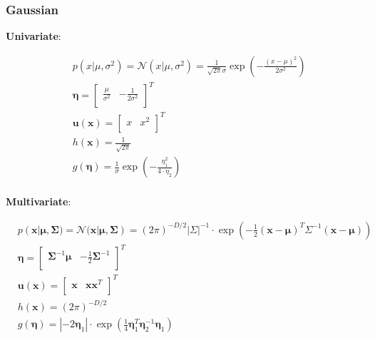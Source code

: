 \subsubsection{Gaussian}
\textbf{Univariate}:
\begin{fleqn}[\parindent]
	\begin{equation*}
	\begin{split}
	& p(x|\mu, \sigma^2) = \mathcal{N}(x|\mu, \sigma^2) = \frac{1}{\sqrt{2\pi}\sigma}\exp\left(-\frac{(x-\mu)^2}{2\sigma^2}\right)\\[8pt]
	& \bm{\eta} = \begin{bmatrix}
	\frac{\mu}{\sigma^2} & -\frac{1}{2\sigma^2}\\
	\end{bmatrix}^T\\
	& \bm{u}(\bm{x}) = \begin{bmatrix}
	x & x^2\\
	\end{bmatrix}^T\\
	& h(\bm{x}) = \frac{1}{\sqrt{2\pi}}\\
	& g(\bm{\eta}) = \frac{1}{\sigma}\exp\left(-\frac{\eta_1^2}{4\cdot \eta_2}\right)\\
	\end{split}
	\end{equation*}
\end{fleqn}
\textbf{Multivariate}:
\begin{fleqn}[\parindent]
	\begin{equation*}
		\begin{split}
			& p(\bm{x}|\bm{\mu}, \bm{\Sigma}) = \mathcal{N}(\bm{x}|\bm{\mu}, \bm{\Sigma}) = (2\pi)^{-D/2}|\Sigma|^{-1}\cdot \exp\left(-\frac{1}{2}(\bm{x}-\bm{\mu})^T\Sigma^{-1}(\bm{x}-\bm{\mu})\right)\\[8pt]
			& \bm{\eta} = \begin{bmatrix}
			\bm{\Sigma}^{-1}\bm{\mu} & -\frac{1}{2}\bm{\Sigma}^{-1}\\
			\end{bmatrix}^T\\
			& \bm{u}(\bm{x}) = \begin{bmatrix}
				\bm{x} & \bm{x}\bm{x}^T\\
			\end{bmatrix}^T\\
			& h(\bm{x}) = (2\pi)^{-D/2}\\
			& g(\bm{\eta}) = |-2\bm{\eta}_1| \cdot \exp\left(\frac{1}{4}\bm{\eta}_{1}^T\bm{\eta}_{2}^{-1}\bm{\eta}_{1}\right)\\
		\end{split}
	\end{equation*}
\end{fleqn}
